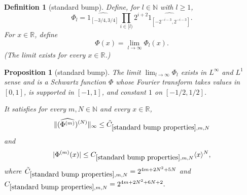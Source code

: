 \documentclass[12pt,reqno]{amsart}
\theoremstyle{plain}
\newtheorem{proposition}[theorem]{Proposition}
\newtheorem{definition}[theorem]{Definition}
\numberwithin{equation}{section}
\theoremstyle{remark}
\newcommand{\uses}[1]{}
\newcommand{\usesdefs}[1]{}
\newcommand{\R}{{\mathbb R}}
\newcommand{\N}{{\mathbb N}}
\begin{document}
\begin{definition}[standard bump]\label{standard bump}\uses{}\usesdefs{}
Define, for \(l\in\N\) with \(l\ge1\),
\begin{equation}\label{auto:standard-bump-finite-product}
 \Phi_l
 =
 \widehat{1_{[-3/4,3/4]}}
 \prod_{i\in [l)}
 2^{i+2}
 \widehat{1_{[-2^{-i-3},2^{-i-3}]}} .
\end{equation}
For $x\in\R$, define
\begin{equation}\label{auto:standard-bump-limit}\Phi(x)=\lim_{l\to\infty}\Phi_l(x).\end{equation}
(The limit exists for every $x\in\R$.)
\end{definition}


\begin{proposition}[standard bump]\label{standard bump properties}\uses{lem:smoothdecay2}\usesdefs{bracket bump,standard bump}
The limit $\lim_{l\to \infty} \Phi_l$ exists in $L^\infty$  and $L^1$ sense and is a Schwartz function $\Phi$
whose Fourier transform takes values in $[0,1]$, is supported in $[-1,1]$, and constant $1$
on $[-1/2,1/2]$.

It satisfies for every $m,N\in\N$ and every $x\in\R$,
\begin{equation}
    \label{Phi_derbound}
    \|  (\widehat{\Phi^{(m)}})^{(N)}  \|_\infty \le \tilde{C}_{\ref{standard bump properties},m,N}
\end{equation}
and
\begin{equation}\label{auto:standard-bump-derivative-decay} |\Phi^{(m)}(x)| \le C_{\ref{standard bump properties},m,N} \langle x\rangle^N, \end{equation}
where $\tilde{C}_{\ref{standard bump properties},m,N}=2^{4m + 2N^2 + 5N}$ and $C_{\ref{standard bump properties},m,N}=2^{4m+2N^2+6N+2}.$
\end{proposition}
\end{document}
